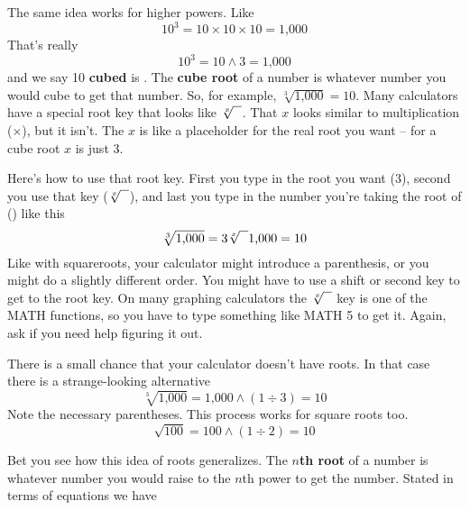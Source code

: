 The same idea works for higher powers.  Like $$10^3 =10 \times 10 \times 10 = \text{1,000}$$ That's really  $$10^3 = 10 \wedge 3 = \text{1,000}$$ and we say
10 \textbf{cubed} is .  The \textbf{cube root} of a number is whatever number you would cube to get that number.  So, for example, $\sqrt[3]{\text{1,000}} = 10$.  Many calculators have a special root key that looks like $\sqrt[x]{\text{\raisebox{.6em}{~\text{  }}}} $.  That $x$ looks similar to multiplication ($\times$), but it isn't.  The $x$ is like a placeholder for the real root you want -- for a cube root $x$ is just 3.  

Here's how to use that root key. First you type in the root you want (3), second you use that key ($\sqrt[x]{\text{\raisebox{.6em}{~\text{  }}}} $), and last you type in the number you're taking the root of () like this
$$\sqrt[3]{\text{1,000}} = 3\sqrt[x]{\text{\raisebox{.6em}{~\text{  }}}}\text{1,000}= 10$$
Like with squareroots, your calculator might introduce a parenthesis, or you might do a slightly different order.  You might have to use a shift or second key to get to the root key.  On many graphing calculators the $\sqrt[x]{\text{\raisebox{.6em}{~\text{  }}}} $ key is one of the MATH functions, so you have to type something like MATH 5 to get it.  Again, ask if you need help figuring it out.  

There is a small chance that your calculator doesn't have roots.  In that case there is a strange-looking alternative
$$\sqrt[3]{\text{1,000}} = \text{1,000} \wedge (1 \div 3)= 10$$
Note the necessary parentheses. This process works for square roots too.
$$\sqrt{100} = \text{100} \wedge (1 \div 2)= 10$$

Bet you see how this idea of roots generalizes.  The \textbf{$n$th root} of a number is whatever number you would raise to the $n$th power to get the number.  Stated in terms of equations we have

 \bigskip
\bigskip

 
